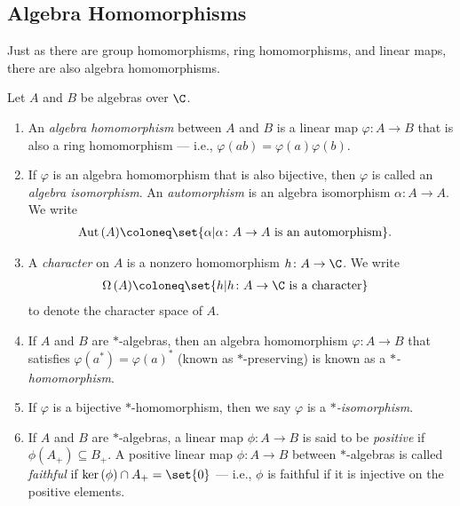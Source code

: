 \subsection{Algebra Homomorphisms}%
Just as there are group homomorphisms, ring homomorphisms, and linear maps, there are also algebra homomorphisms.
\begin{definition}
  Let $A$ and $B$ be algebras over $\C$.
  \begin{enumerate}[(1)]
    \item An \textit{algebra homomorphism} between $A$ and $B$ is a linear map $\varphi\colon A\rightarrow B$ that is also a ring homomorphism --- i.e., $\varphi\left(ab\right) = \varphi\left(a\right)\varphi\left(b\right)$.
    \item If $\varphi$ is an algebra homomorphism that is also bijective, then $\varphi$ is called an \textit{algebra isomorphism}. An \textit{automorphism} is an algebra isomorphism $\alpha\colon A\rightarrow A$. We write
      \begin{align*}
        \operatorname{Aut}\left(A\right) &\coloneq \set{\alpha | \alpha\colon A\rightarrow A\text{ is an automorphism}}.
      \end{align*}
    \item A \textit{character} on $A$ is a nonzero homomorphism $h\colon A\rightarrow \C$. We write
      \begin{align*}
        \Omega\left(A\right) &\coloneq \set{h | h\colon A\rightarrow \C\text{ is a character}}
      \end{align*}
      to denote the character space of $A$.
    \item If $A$ and $B$ are $\ast$-algebras, then an algebra homomorphism $\varphi\colon A\rightarrow B$ that satisfies $\varphi\left(a^{\ast}\right) = \varphi\left(a\right)^{\ast}$ (known as $\ast$-preserving) is known as a \textit{$\ast$-homomorphism}.
    \item If $\varphi$ is a bijective $\ast$-homomorphism, then we say $\varphi$ is a \textit{$\ast$-isomorphism}.
    \item If $A$ and $B$ are $\ast$-algebras, a linear map $\phi\colon A\rightarrow B$ is said to be \textit{positive} if $\phi\left(A_{+}\right)\subseteq B_{+}$. A positive linear map $\phi\colon A\rightarrow B$ between $\ast$-algebras is called \textit{faithful} if $\ker\left(\phi\right)\cap A_{+} = \set{0}$ --- i.e., $\phi$ is faithful if it is injective on the positive elements.
  \end{enumerate}
\end{definition}
